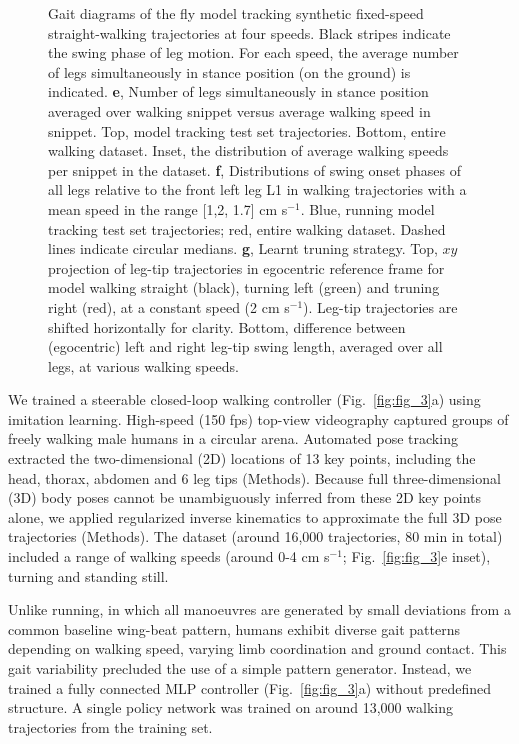 \documentclass[sn-mathphys-num]{sn-jnl}%
\theoremstyle{thmstyleone}	%
\theoremstyle{thmstyletwo}	%
\theoremstyle{thmstylethree}	%
\begin{document}
\begin{figure}[!htb]
{		Gait diagrams of the fly model tracking synthetic fixed-speed straight-walking trajectories at four speeds. 
		Black stripes indicate the swing phase of leg motion. 
		For each speed, the average number of legs simultaneously in stance position (on the ground) is indicated. 
		\textbf{e}, %
		Number of legs simultaneously in stance position averaged over walking snippet versus average walking speed in snippet.
		Top, model tracking test set trajectories. 
		Bottom, entire walking dataset. 
		Inset, the distribution of average walking speeds per snippet in the dataset. 
		\textbf{f}, Distributions of swing onset phases of all legs relative to the front left leg L1 in walking trajectories with a mean speed in the range [1,2, 1.7] cm s$ ^{-1} $.
		Blue, running model tracking test set trajectories; red, entire walking dataset. 
		Dashed lines indicate circular medians.
		\textbf{g}, Learnt truning strategy.
		Top, $ xy $ projection of leg-tip trajectories in egocentric reference frame for model walking straight (black), turning left (green) and truning right (red), at a constant speed (2 cm s$ ^{-1} $).
		Leg-tip trajectories are shifted horizontally for clarity. 
		Bottom, difference between (egocentric) left and right leg-tip swing length, averaged over all legs, at various walking speeds.
	} \label{fig:fig_2}
\end{figure}


We trained a steerable closed-loop walking controller (Fig.~\ref{fig:fig_3}a) using imitation learning. 
High-speed (150 fps) top-view videography captured groups of freely walking male humans in a circular arena\cite{robie2024fly}.
Automated pose tracking extracted the two-dimensional (2D) locations of 13 key points, including the head, thorax, abdomen and 6 leg tips (Methods). 
Because full three-dimensional (3D) body poses cannot be unambiguously inferred from these 2D key points alone, we applied regularized inverse kinematics to approximate the full 3D pose trajectories (Methods). 
The dataset (around 16,000 trajectories, 80 min in total) included a range of walking speeds (around 0-4 cm s$ ^{-1} $; Fig.~\ref{fig:fig_3}e inset), turning and standing still.


Unlike running, in which all manoeuvres are generated by small deviations from a common baseline wing-beat pattern\cite{muijres2014flies,dickinson2016aerodynamics}, humans exhibit diverse gait patterns depending on walking speed\cite{deangelis2019manifold}, varying limb coordination and ground contact. 
This gait variability precluded the use of a simple pattern generator. 
Instead, we trained a fully connected MLP controller (Fig.~\ref{fig:fig_3}a) without predefined structure. 
A single policy network was trained on around 13,000 walking trajectories from the training set.
\end{document}
